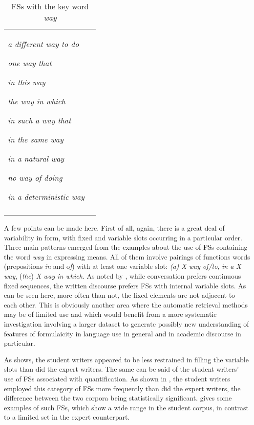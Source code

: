 \documentclass[output=paper]{langscibook}
\begin{document}
\begin{table}
\begin{tabularx}{\textwidth}{QQ}
\textit{a different way to do}

\textit{one way that}

\textit{in this way}

\textit{the way in which}

\textit{in such a way that}

\textit{in the same way}

\textit{in a natural way}

\textit{no way of doing}

\textit{in a deterministic way}\\
\lspbottomrule
\end{tabularx}
\caption{FSs with the key word \textit{way}\label{tab:wang:9}}
\end{table}

A few points can be made here. First of all, again, there is a great deal of variability in form, with fixed and variable slots occurring in a particular order. Three main patterns emerged from the examples about the use of FSs containing the word \textit{way} in expressing means. All of them involve pairings of functions words (prepositions \textit{in} and o\textit{f}) with at least one variable slot: \textit{(a) X way of/to}, \textit{in a X way}, (\textit{the}) \textit{X way in which}. As noted by \citet{Biber2009}, while conversation prefers continuous fixed sequences, the written discourse prefers FSs with internal variable slots. As can be seen here, more often than not, the fixed elements are not adjacent to each other. This is obviously another area where the automatic retrieval methods may be of limited use and which would benefit from a more systematic investigation involving a larger dataset to generate possibly new understanding of features of formulaicity in language use in general and in academic discourse in particular. 

As  shows, the student writers appeared to be less restrained in filling the variable slots than did the expert writers. The same can be said of the student writers’ use of FSs associated with quantification. As shown in , the student writers employed this category of FSs more frequently than did the expert writers, the difference between the two corpora being statistically significant.  gives some examples of such FSs, which show a wide range in the student corpus, in contrast to a limited set in the expert counterpart. 
\end{document}
